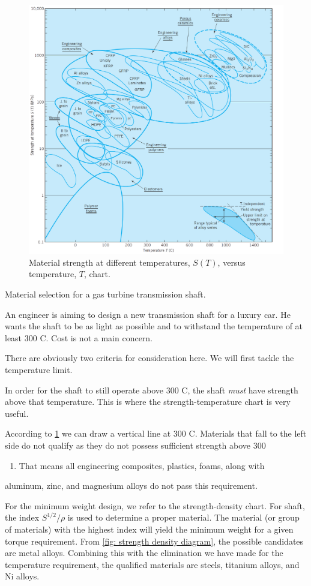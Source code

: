 \documentclass[a4paper,openany,nobib]{tufte-book}
\begin{document}
\begin{enumerate}
\begin{figure}[htbp]
\centering
\includegraphics[width=.9\linewidth]{pictures/Material-selection/strength-temperature-diagram.pdf}
\caption{\label{fig: strength temperature diagram}Material strength at different temperatures, \(S(T)\), versus temperature, \(T\), chart. \cite{ashby2010materials}}
\end{figure}

Material selection for a gas turbine transmission shaft.

An engineer is aiming to design a new transmission shaft for a luxury
car. He wants the shaft to be as light as possible and to withstand the
temperature of at least 300 C. Cost is not a main concern.

There are obviously two criteria for consideration here. We will first
tackle the temperature limit.

In order for the shaft to still operate above 300 C, the shaft \emph{must}
have strength above that temperature. This is where the
strength-temperature chart is very useful.

According to \ref{fig: strength temperature diagram} we can draw a vertical line at 300 C. Materials that fall to the left
side do not qualify as they do not possess sufficient strength above 300
\begin{enumerate}
\item That means all engineering composites, plastics, foams, along with
\end{enumerate}
aluminum, zinc, and magnesium alloys do not pass this requirement.

For the minimum weight design, we refer to the strength-density chart.
For shaft, the index \(S^{1/2}/\rho\) is used to determine a proper
material. The material (or group of materials) with the highest index
will yield the minimum weight for a given torque requirement. From
\ref{fig: strength density diagram}, the
possible candidates are metal alloys. Combining this with the
elimination we have made for the temperature requirement, the qualified
materials are steels, titanium alloys, and Ni alloys.
\end{enumerate}
\end{document}
